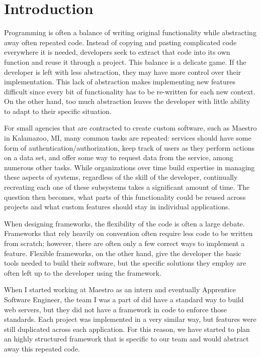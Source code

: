 \section{Introduction}

Programming is often a balance of writing original functionality while abstracting away often repeated code.  Instead of copying and pasting complicated code everywhere it is needed, developers seek to extract that code into its own function and reuse it through a project. This balance is a delicate game.  If the developer is left with less abstraction, they may have more control over their implementation. This lack of abstraction makes implementing new features difficult since every bit of functionality has to be re-written for each new context.  On the other hand, too much abstraction leaves the developer with little ability to adapt to their specific situation.

For small agencies that are contracted to create custom software, such as Maestro in Kalamazoo, MI, many common tasks are repeated:  services should have some form of authentication/authorization, keep track of users as they perform actions on a data set, and offer some way to request data from the service, among numerous other tasks.  While organizations over time build expertise in managing these aspects of systems, regardless of the skill of the developer, continually recreating each one of these subsystems takes a significant amount of time.  The question then becomes, what parts of this functionality could be reused across projects and what custom features should stay in individual applications.

When designing frameworks, the flexibility of the code is often a large debate.  Frameworks that rely heavily on convention often require less code to be written from scratch; however, there are often only a few correct ways to implement a feature.  Flexible frameworks, on the other hand, give the developer the basic tools needed to build their software, but the specific solutions they employ are often left up to the developer using the framework.

When I started working at Maestro as an intern and eventually Apprentice Software Engineer, the team I was a part of did have a standard way to build web servers, but they did not have a framework in code to enforce those standards.  Each project was implemented in a very similar way, but features were still duplicated across each application.  For this reason, we have started to plan an highly structured framework that is specific to our team and would abstract away this repeated code.

